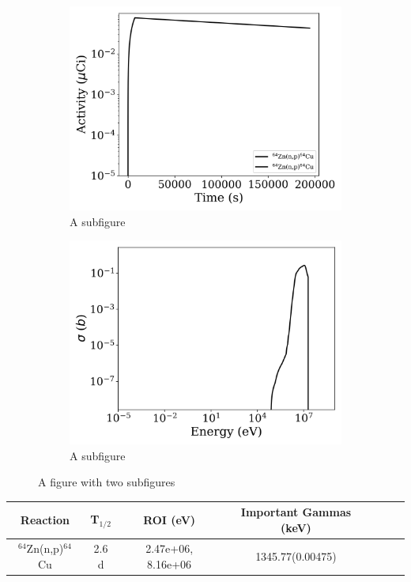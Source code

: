 \begin{figure}[h]
\centering
\begin{subfigure}{.5\textwidth}
  \centering
     \includegraphics[width=.8\textwidth]{plot/Zn-64(n,p)Cu-64_wisconsin1} 

  \caption{A subfigure}
  \label{fig:sub1}
\end{subfigure}%
\begin{subfigure}{.5\textwidth}
  \centering
     \includegraphics[width=.8\textwidth]{plot/Zn-64(n,p)Cu-64} 

  \caption{A subfigure}
  \label{fig:sub2}
\end{subfigure}
\caption{A figure with two subfigures}
\label{fig:test}
\end{figure}

\begin{table}[h]
\centering
\begin{tabular}{ |c|c|c|c|c|c|c| }
 \hline
 Reaction & T$_{1/2}$ & ROI (eV) & Important Gammas (keV) \\
 \hline 
 $^{64}$Zn(n,p)$^{64}$Cu &  2.6 d & 2.47e+06, 8.16e+06 & 1345.77(0.00475) \\ 
\hline
\end{tabular}
\end{table}
